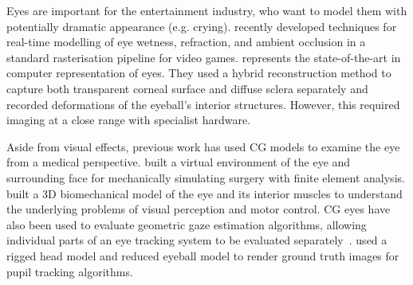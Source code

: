 
Eyes are important for the entertainment industry, who want to model them with potentially dramatic appearance (e.g. crying).
\mbox{\citet{ActiBlizEyes}} recently developed techniques for real-time modelling of eye wetness, refraction, and ambient occlusion in a standard rasterisation pipeline for video games.
\citet{berard2014highquality} represents the state-of-the-art in computer representation of eyes.
They used a hybrid reconstruction method to capture both transparent corneal surface and diffuse sclera separately and recorded deformations of the eyeball's interior structures.
However, this required imaging at a close range with specialist hardware.

Aside from visual effects, previous work has used CG models to examine the eye from a medical perspective.
\citet{sagar1994virtual} built a virtual environment of the eye and surrounding face for mechanically simulating surgery with finite element analysis.
\citet{priamikov14_openeyesim} built a 3D biomechanical model of the eye and its interior muscles to understand the underlying problems of visual perception and motor control.
CG eyes have also been used to evaluate geometric gaze estimation algorithms, allowing individual parts of an eye tracking system to be evaluated separately~\cite{bohme2008software,swirski2014rendering}.
\citet{swirski2014rendering} used a rigged head model and reduced eyeball model to render ground truth images for pupil tracking algorithms.




